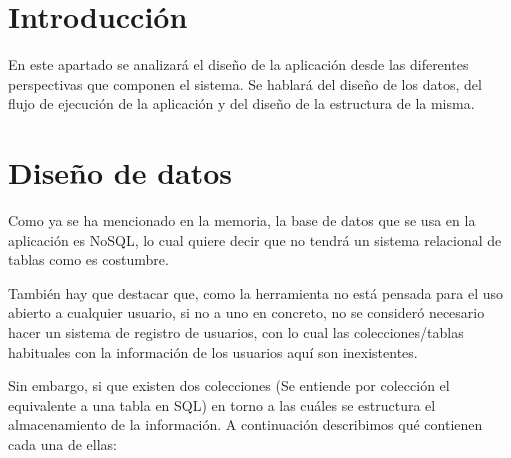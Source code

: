 
\section{Introducción}

En este apartado se analizará el diseño de la aplicación desde las diferentes perspectivas que componen el sistema. Se hablará del diseño de los datos, del flujo de ejecución de la aplicación y del diseño de la estructura de la misma.

\section{Diseño de datos}

Como ya se ha mencionado en la memoria, la base de datos que se usa en la aplicación es NoSQL, lo cual quiere decir que no tendrá un sistema relacional de tablas como es costumbre. 

También hay que destacar que, como la herramienta no está pensada para el uso abierto a cualquier usuario, si no a uno en concreto, no se consideró necesario hacer un sistema de registro de usuarios, con lo cual las colecciones/tablas habituales con la información de los usuarios aquí son inexistentes.

Sin embargo, si que existen dos colecciones (Se entiende por colección el equivalente a una tabla en SQL) en torno a las cuáles se estructura el almacenamiento de la información. A continuación describimos qué contienen cada una de ellas:

